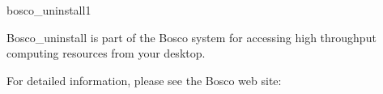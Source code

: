 \begin{ManPage}{\label{man-bosco-uninstall}bosco\_uninstall}{1}
{Bosco\_uninstall is part of the Bosco system for accessing high
throughput computing resources from your desktop.

For detailed information, please see the Bosco web site:
}


\end{ManPage}

